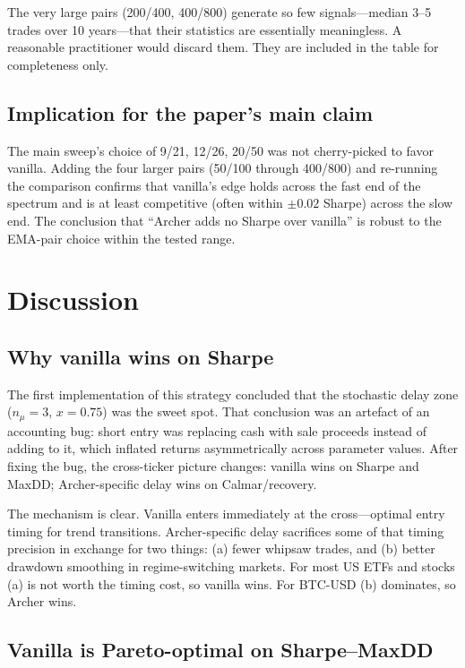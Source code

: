 \documentclass[11pt,a4paper]{article}
\begin{document}
The very large pairs (200/400, 400/800) generate so few signals---median 3--5 trades over 10 years---that their statistics are essentially meaningless. A reasonable practitioner would discard them. They are included in the table for completeness only.

\subsection{Implication for the paper's main claim}

The main sweep's choice of 9/21, 12/26, 20/50 was not cherry-picked to favor vanilla. Adding the four larger pairs (50/100 through 400/800) and re-running the comparison confirms that vanilla's edge holds across the fast end of the spectrum and is at least competitive (often within $\pm 0.02$ Sharpe) across the slow end. The conclusion that ``Archer adds no Sharpe over vanilla'' is robust to the EMA-pair choice within the tested range.

\section{Discussion}

\subsection{Why vanilla wins on Sharpe}

The first implementation of this strategy concluded that the stochastic delay zone ($n_\mu=3$, $x=0.75$) was the sweet spot. That conclusion was an artefact of an accounting bug: short entry was replacing cash with sale proceeds instead of adding to it, which inflated returns asymmetrically across parameter values. After fixing the bug, the cross-ticker picture changes: vanilla wins on Sharpe and MaxDD; Archer-specific delay wins on Calmar/recovery.

The mechanism is clear. Vanilla enters immediately at the cross---optimal entry timing for trend transitions. Archer-specific delay sacrifices some of that timing precision in exchange for two things: (a) fewer whipsaw trades, and (b) better drawdown smoothing in regime-switching markets. For most US ETFs and stocks (a) is not worth the timing cost, so vanilla wins. For BTC-USD (b) dominates, so Archer wins.

\subsection{Vanilla is Pareto-optimal on Sharpe--MaxDD}
\end{document}
